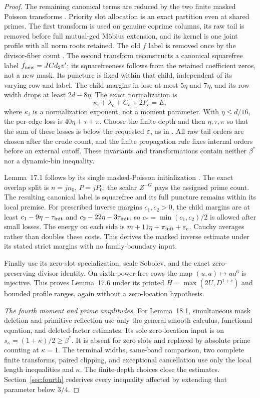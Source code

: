 \begin{proof}
The remaining canonical terms are reduced by the two finite masked Poisson transforms . Priority slot allocation is an exact partition even at shared primes. The first transform is used on genuine coprime columns, its raw tail is removed before full mutual-gcd Möbius extension, and its kernel is one joint profile with all norm roots retained. The old $f$ label is removed once by the divisor-fiber count . The second transform reconstructs a canonical squarefree label $f_{\rm new}=JCd_2v'$; its squarefreeness follows from the retained coefficient zeros, not a new mask. Its puncture is fixed within that child, independent of its varying row and label. The child margins in  lose at most $5\eta$ and $7\eta$, and its row width drops at least $2d-8\eta$. The exact normalization  is
\[
 \kappa_i+\lambda_c+C_c+2F_c=E,
\]
where $\kappa_i$ is a normalization exponent, not a moment parameter. With $\eta\le d/16$, the per-edge loss is $40\eta+\tau+\pi$. Choose the finite depth and then $\eta,\tau,\pi$ so that the sum of these losses is below the requested $\varepsilon$, as in . All raw tail orders are chosen after the crude count, and the finite propagation rule fixes internal orders before an external cutoff. These invariants and transformations contain neither $\beta^*$ nor a dynamic-bin inequality.

Lemma~17.1 follows by its single masked-Poisson initialization . The exact overlap split is $n=jn_0$, $P=jP_0$; the scalar $Z^{-G}$ pays the assigned prime count. The resulting canonical label is squarefree and its full puncture remains within its local premise. For prescribed inverse margins $c_1,c_2>0$, the child margins are at least $c_1-9\eta-\tau_{\rm init}$ and $c_2-22\eta-3\tau_{\rm init}$, so $c_*=\min(c_1,c_2)/2$ is allowed after small losses. The energy on each side is $m+11\eta+\pi_{\rm init}+\varepsilon_c$. Cauchy averages rather than doubles these costs. This derives the marked inverse estimate under its stated strict margins with no family-boundary input.

Finally  use its zero-slot specialization, scale Sobolev, and the exact zero-preserving divisor identity. On sixth-power-free rows the map $(u,a)\mapsto ua^6$ is injective. This proves Lemma~17.6 under its printed $H=\max(2U,D^{1+c})$ and bounded profile ranges, again without a zero-location hypothesis.

\emph{The fourth moment and prime amplitudes.}
For Lemma~18.1, simultaneous mask deletion and primitive reflection  use only the general smooth calculus, functional equation, and deleted-factor estimates. Its sole zero-location input is  on $s_\kappa=(1+\kappa)/2\ge\beta^*$. It is absent for zero slots and replaced by absolute prime counting at $\kappa=1$. The terminal widths, same-band comparison, two complete finite transforms, paired clipping, and exceptional cancellation  use only the local length inequalities and $\kappa$. The finite-depth choices  close the estimates. Section~\ref{sec:fourth} rederives every inequality affected by extending that parameter below $3/4$.


\end{proof}

